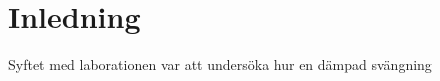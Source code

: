 \documentclass[a4paper,10pt]{article}
\begin{document}
\section{Inledning}
Syftet med laborationen var att undersöka hur en dämpad svängning 
\end{document}
